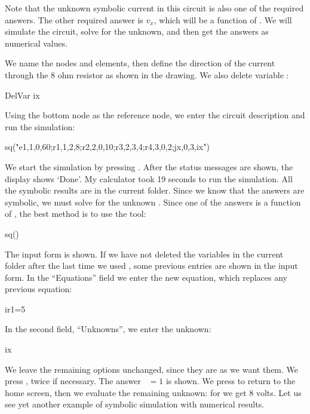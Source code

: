 Note that the unknown symbolic current  in this circuit is
also one of the required answers. The other required answer is
$v_x$, which will be a function of . We will simulate the
circuit, solve for the unknown, and then get the answers as
numerical values.

We name the nodes and elements, then define the direction of the
current through the 8 ohm resistor as shown in the drawing. We also
delete variable :

\begin{entry}
DelVar ix
\end{entry}

Using the bottom node as the reference node, we enter the circuit
description and run the simulation:

\begin{entry}
sq\dc("e1,1,0,60;r1,1,2,8;r2,2,0,10;r3,2,3,4;r4,3,0,2;jx,0,3,ix")
\end{entry}

We start the simulation by pressing . After the status
messages are shown, the display shows `Done'. My calculator took 19
seconds to run the simulation. All the symbolic results are in the
current folder. Since we know that the answers are symbolic, we must
solve for the unknown . Since one of the answers is a
function of , the best method is to use the 
tool:

\begin{entry}
sq\solves()
\end{entry}

The input form is shown. If we have not deleted the variables in the
current folder after the last time we used , some
previous entries are shown in the input form. In the ``Equations''
field we enter the new equation, which replaces any previous
equation:

\begin{entry}
ir1=5
\end{entry}

In the second field, ``Unknowns'', we enter the unknown:

\begin{entry}
ix
\end{entry}

We leave the remaining options unchanged, since they are as we want
them. We press , twice if necessary. The answer
~$= 1$ is shown. We press  to return to the home
screen, then we evaluate the remaining unknown: for  we get
8 volts. Let us see yet another example of symbolic simulation with
numerical results.


